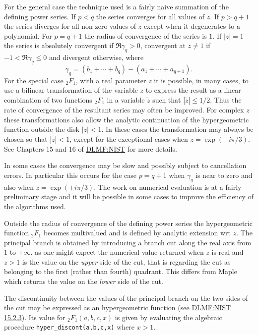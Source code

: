 For the general case the technique used is a fairly naive summation of the
defining power series. If $p<q$ the series converges for all values of $z$.
If $p>q+1$ the series diverges for all non-zero values of $z$ except when it degenerates to a polynomial. 
 For $p=q+1$ the radius of convergence of the series is $1$. If $|z|=1$ the series is absolutely
convergent if $\Re\gamma_q >0$, convergent at $z \neq 1$ if
$-1<\Re\gamma_q \leq 0$ and divergent otherwise, where
\[
\gamma_q = (b_1 + \cdots + b_q) - (a_1 + \cdots + a_{q+1}).
\]
For the special case $_2F_1$, with a real parameter $z$ it is possible, in many
cases, to use a bilinear transformation of the variable $z$ to express the result as a
linear combination of two functions $_2F_1$ in a variable $\tilde z$ such that
$|\tilde z|\leq 1/2$. Thus the rate of convergence of the resultant series may often
be improved.  For complex $z$ these transformations also allow the analytic
continuation of the hypergeometric function outside the disk $|z|<1$.  In these
cases the transformation  may always be chosen so that $|\tilde z| <1$, except
for the exceptional cases when $z=\exp(\pm i\pi/3)$.  See Chapters 15 and 16 of
\href{https://dlmf.nist.gov/} {DLMF:NIST} for more details.

In some cases the convergence may be slow and possibly subject to cancellation errors. In particular this
occurs for the case $p=q+1$ when $\gamma_q$ is near to zero and also when $z=\exp(\pm i\pi/3)$.
The work on numerical evaluation is at a fairly preliminary stage and it will be
possible in some cases to improve the efficiency of the algorithms used.

Outside the radius of convergence of the defining power series the
hypergeometric function $_2F_1$ becomes multivalued and is defined by analytic
extension wrt $z$. The principal branch is obtained by introducing a branch cut
along the real axis from $1$ to $+\infty$.  as one might expect the numerical value returned  when
$z$ is real and $z>1$ is the value on the \emph{upper} side of the cut, that is
regarding the cut as belonging to the first (rather than fourth) quadrant.
This differs from Maple which returns the value on the \emph{lower} side of the cut. 

The discontinuity between the values of the principal branch on the two sides of the cut may
be expressed as an hypergeometric function (see \href{https://dlmf.nist.gov/15.2} {DLMF:NIST 15.2.3}).  
 Its value for $_2F_1({a,b},{c}, x)$ is given by evaluating the algebraic procedure
\texttt{hyper\_discont(a,b,c,x)} where $x>1$.


